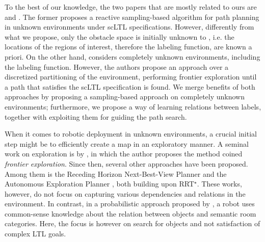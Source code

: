 To the best of our knowledge, the two papers that are mostly related to ours are \cite{kantaros2020reactive} and \cite{ayala2013temporal}. The former proposes a reactive sampling-based algorithm for path planning in unknown environments under scLTL specifications. However, differently from what we propose, only the obstacle space is initially unknown to \cite{kantaros2020reactive}, i.e. the locations of the regions of interest, therefore the labeling function, are {known} a priori. On the other hand, \citet{ayala2013temporal} considers completely unknown environments, including the labeling function. However, the authors propose an approach over a discretized partitioning of the environment, performing frontier exploration \cite{yamauchi1997frontier} until a path that satisfies the scLTL specification is found. We merge benefits of both approaches by proposing a sampling-based approach on completely unknown environments; furthermore, we propose a way of learning relations between labels, together with exploiting them for guiding the path search.


When it comes to robotic deployment in unknown environments, a crucial initial step might be to efficiently create a map in an exploratory manner. A seminal work on exploration is by \citet{yamauchi1997frontier}, in which the author proposes the method coined \emph{frontier exploration}. Since then, several other approaches have been proposed. Among them is the Receding Horizon Next-Best-View Planner \cite{bircher2016receding} and the Autonomous Exploration Planner \cite{selin2019efficient}, both building upon RRT$^\star$. These works, however, do not focus on capturing various dependencies and relations in the environment. In  contrast, in a probabilistic approach proposed by \citet{aydemir2013active}, a robot uses common-sense knowledge about the relation between objects and semantic room categories. Here, the focus is however on search for objects and not satisfaction of complex LTL goals. 
